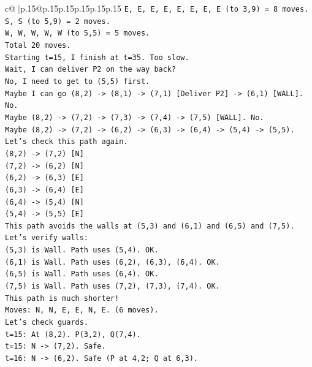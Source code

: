 \documentclass{article}
\begin{document}
{\begin{supertabular}{c@{$\;$}|p{.15\linewidth}@{}p{.15\linewidth}p{.15\linewidth}p{.15\linewidth}p{.15\linewidth}p{.15\linewidth}}
{{{\texttt{E, E, E, E, E, E, E, E (to 3,9) = 8 moves.} \\
\texttt{S, S (to 5,9) = 2 moves.} \\
\texttt{W, W, W, W, W (to 5,5) = 5 moves.} \\
\texttt{Total 20 moves.} \\
\texttt{Starting t=15, I finish at t=35. Too slow.} \\
\texttt{Wait, I can deliver P2 on the way back?} \\
\texttt{No, I need to get to (5,5) first.} \\
\texttt{Maybe I can go (8,2) {-}> (8,1) {-}> (7,1) {[}Deliver P2{]} {-}> (6,1) {[}WALL{]}. No.} \\
\texttt{Maybe (8,2) {-}> (7,2) {-}> (7,3) {-}> (7,4) {-}> (7,5) {[}WALL{]}. No.} \\
\texttt{Maybe (8,2) {-}> (7,2) {-}> (6,2) {-}> (6,3) {-}> (6,4) {-}> (5,4) {-}> (5,5).} \\
\texttt{Let's check this path again.} \\
\texttt{(8,2) {-}> (7,2) {[}N{]}} \\
\texttt{(7,2) {-}> (6,2) {[}N{]}} \\
\texttt{(6,2) {-}> (6,3) {[}E{]}} \\
\texttt{(6,3) {-}> (6,4) {[}E{]}} \\
\texttt{(6,4) {-}> (5,4) {[}N{]}} \\
\texttt{(5,4) {-}> (5,5) {[}E{]}} \\
\texttt{This path avoids the walls at (5,3) and (6,1) and (6,5) and (7,5).} \\
\texttt{Let's verify walls:} \\
\texttt{(5,3) is Wall. Path uses (5,4). OK.} \\
\texttt{(6,1) is Wall. Path uses (6,2), (6,3), (6,4). OK.} \\
\texttt{(6,5) is Wall. Path uses (6,4). OK.} \\
\texttt{(7,5) is Wall. Path uses (7,2), (7,3), (7,4). OK.} \\
\texttt{This path is much shorter!} \\
\texttt{Moves: N, N, E, E, N, E. (6 moves).} \\
\texttt{Let's check guards.} \\
\texttt{t=15: At (8,2). P(3,2), Q(7,4).} \\
\texttt{t=15: N {-}> (7,2). Safe.} \\
\texttt{t=16: N {-}> (6,2). Safe (P at 4,2; Q at 6,3).} \\
}}}
\end{supertabular}}
\end{document}
